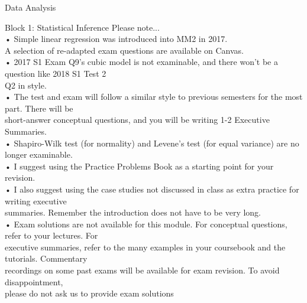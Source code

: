 \documentclass[
  ignorenonframetext,
]{beamer}
\begin{document}
\begin{frame}{Data Analysis}
\begin{block}{Block 1: Statistical Inference}
Please note...\\
• Simple linear regression was introduced into MM2 in 2017.\\
A selection of re-adapted exam questions are available on Canvas.\\
• 2017 S1 Exam Q9's cubic model is not examinable, and there won't be a
question like 2018 S1 Test 2\\
Q2 in style.\\
• The test and exam will follow a similar style to previous semesters
for the most part. There will be\\
short-answer conceptual questions, and you will be writing 1-2 Executive
Summaries.\\
• Shapiro-Wilk test (for normality) and Levene's test (for equal
variance) are no longer examinable.\\
• I suggest using the Practice Problems Book as a starting point for
your revision.\\
• I also suggest using the case studies not discussed in class as extra
practice for writing executive\\
summaries. Remember the introduction does not have to be very long.\\
• Exam solutions are not available for this module. For conceptual
questions, refer to your lectures. For\\
executive summaries, refer to the many examples in your coursebook and
the tutorials. Commentary\\
recordings on some past exams will be available for exam revision. To
avoid disappointment,\\
please do not ask us to provide exam solutions
\end{block}
\end{frame}
\end{document}
